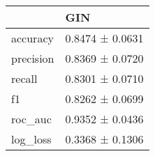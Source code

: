 \begin{tabular}{ll}
\toprule
 & GIN \\
\midrule
accuracy & 0.8474 ± 0.0631 \\
precision & 0.8369 ± 0.0720 \\
recall & 0.8301 ± 0.0710 \\
f1 & 0.8262 ± 0.0699 \\
roc_auc & 0.9352 ± 0.0436 \\
log_loss & 0.3368 ± 0.1306 \\
\bottomrule
\end{tabular}
